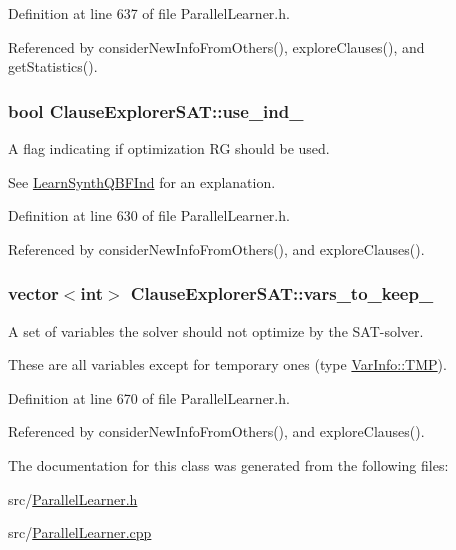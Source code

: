 Definition at line 637 of file Parallel\-Learner.\-h.



Referenced by consider\-New\-Info\-From\-Others(), explore\-Clauses(), and get\-Statistics().

\hypertarget{classClauseExplorerSAT_aca59e0b38c8a8fea9cf35d174969c41e}{
\subsubsection[{use\-\_\-ind\-\_\-}]{\setlength{\rightskip}{0pt plus 5cm}bool Clause\-Explorer\-S\-A\-T\-::use\-\_\-ind\-\_\-\hspace{0.3cm}{\ttfamily [protected]}}}\label{classClauseExplorerSAT_aca59e0b38c8a8fea9cf35d174969c41e}


A flag indicating if optimization R\-G should be used. 

See \hyperlink{classLearnSynthQBFInd}{Learn\-Synth\-Q\-B\-F\-Ind} for an explanation. 

Definition at line 630 of file Parallel\-Learner.\-h.



Referenced by consider\-New\-Info\-From\-Others(), and explore\-Clauses().

\hypertarget{classClauseExplorerSAT_a9d9c6caf1a451ed22a096c2ef5e8bbc2}{
\subsubsection[{vars\-\_\-to\-\_\-keep\-\_\-}]{\setlength{\rightskip}{0pt plus 5cm}vector$<$int$>$ Clause\-Explorer\-S\-A\-T\-::vars\-\_\-to\-\_\-keep\-\_\-\hspace{0.3cm}{\ttfamily [protected]}}}\label{classClauseExplorerSAT_a9d9c6caf1a451ed22a096c2ef5e8bbc2}


A set of variables the solver should not optimize by the S\-A\-T-\/solver. 

These are all variables except for temporary ones (type \hyperlink{classVarInfo_a64d1da76cf84fe674e5fef9764ef11cfa84a2d8d86f004930fe564dc5b395b29f}{Var\-Info\-::\-T\-M\-P}). 

Definition at line 670 of file Parallel\-Learner.\-h.



Referenced by consider\-New\-Info\-From\-Others(), and explore\-Clauses().



The documentation for this class was generated from the following files\-:\begin{DoxyCompactItemize}
\item 
src/\hyperlink{ParallelLearner_8h}{Parallel\-Learner.\-h}\item 
src/\hyperlink{ParallelLearner_8cpp}{Parallel\-Learner.\-cpp}\end{DoxyCompactItemize}
